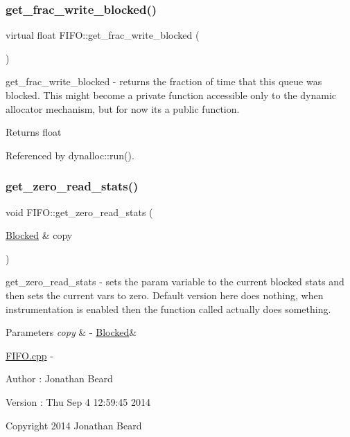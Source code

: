 \subsubsection{\texorpdfstring{get\+\_\+frac\+\_\+write\+\_\+blocked()}{get\_frac\_write\_blocked()}}
{\footnotesize\ttfamily virtual float F\+I\+F\+O\+::get\+\_\+frac\+\_\+write\+\_\+blocked (\begin{DoxyParamCaption}{ }\end{DoxyParamCaption})\hspace{0.3cm}{\ttfamily [pure virtual]}}

get\+\_\+frac\+\_\+write\+\_\+blocked -\/ returns the fraction of time that this queue was blocked. This might become a private function accessible only to the dynamic allocator mechanism, but for now its a public function. \begin{DoxyReturn}{Returns}
float 
\end{DoxyReturn}


Referenced by dynalloc\+::run().

\hypertarget{class_f_i_f_o_aa372ba61179c80ce8355aadbdbbad844}{}\label{class_f_i_f_o_aa372ba61179c80ce8355aadbdbbad844} 
\subsubsection{\texorpdfstring{get\+\_\+zero\+\_\+read\+\_\+stats()}{get\_zero\_read\_stats()}}
{\footnotesize\ttfamily void F\+I\+F\+O\+::get\+\_\+zero\+\_\+read\+\_\+stats (\begin{DoxyParamCaption}\item[{\hyperlink{struct_blocked}{Blocked} \&}]{copy }\end{DoxyParamCaption})\hspace{0.3cm}{\ttfamily [virtual]}}

get\+\_\+zero\+\_\+read\+\_\+stats -\/ sets the param variable to the current blocked stats and then sets the current vars to zero. Default version here does nothing, when instrumentation is enabled then the function called actually does something. 
\begin{DoxyParams}{Parameters}
{\em copy} & -\/ \hyperlink{struct_blocked}{Blocked}\&\\
\hline
\end{DoxyParams}
\hyperlink{fifo_8cpp_source}{F\+I\+F\+O.\+cpp} -\/ \begin{DoxyAuthor}{Author}
\+: Jonathan Beard 
\end{DoxyAuthor}
\begin{DoxyVersion}{Version}
\+: Thu Sep 4 12\+:59\+:45 2014
\end{DoxyVersion}
Copyright 2014 Jonathan Beard

